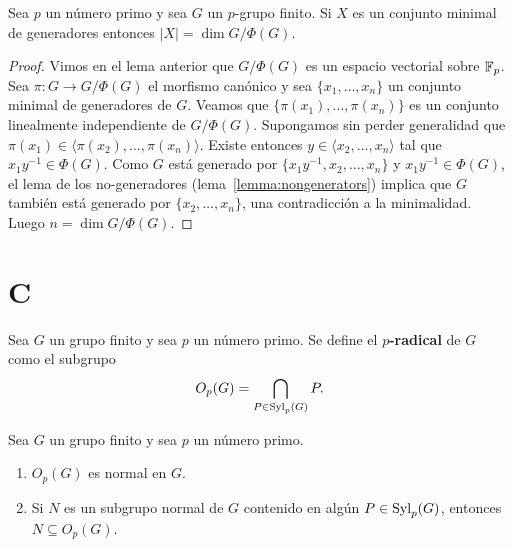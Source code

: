 \begin{theorem}[Burnside]
	\label{theorem:Burnside:basis}
	Sea $p$ un número primo y sea $G$ un $p$-grupo finito. Si $X$ es un
	conjunto minimal de generadores entonces $|X|=\dim G/\Phi(G)$. 
\end{theorem}


\begin{proof}
	Vimos en el lema anterior que $G/\Phi(G)$ es un espacio
	vectorial sobre $\mathbb{F}_p$. Sea $\pi\colon G\to G/\Phi(G)$ el morfismo canónico
	y sea $\{x_1,\dots,x_n\}$ un conjunto minimal de generadores de $G$.
	Veamos que $\{\pi(x_1),\dots,\pi(x_n)\}$ es un conjunto linealmente
	independiente de $G/\Phi(G)$.  Supongamos sin perder generalidad que
	$\pi(x_1)\in\langle \pi(x_2),\dots,\pi(x_n)\rangle$. Existe entonces $y\in
	\langle x_2,\dots,x_n\rangle$ tal que $x_1y^{-1}\in\Phi(G)$. Como $G$ está
	generado por $\{x_1y^{-1},x_2,\dots,x_n\}$ y $x_1y^{-1}\in\Phi(G)$, el 
	lema de los no-generadores (lema~\ref{lemma:nongenerators}) implica que $G$ también está generado por
	$\{x_2,\dots,x_n\}$, una contradicción a la minimalidad. Luego $n=\dim
	G/\Phi(G)$.
\end{proof}



\section*{C}

\begin{definition}
	Sea $G$ un grupo finito y sea $p$ un número primo. Se define el
	\textbf{$p$-radical} de $G$ como el subgrupo
	\[
		O_p(G)=\bigcap_{P\in\mathrm{Syl}_p(G)}P.
	\]
\end{definition}

\begin{lemma}
	\label{lemma:core:Op(G)}
	Sea $G$ un grupo finito y sea $p$ un número primo. 
	\begin{enumerate}
		\item $O_p(G)$ es normal en $G$.
		\item Si $N$ es un subgrupo normal de $G$ contenido en algún
			$P\in\mathrm{Syl}_p(G)$, entonces $N\subseteq O_p(G)$.
	\end{enumerate}
\end{lemma}


